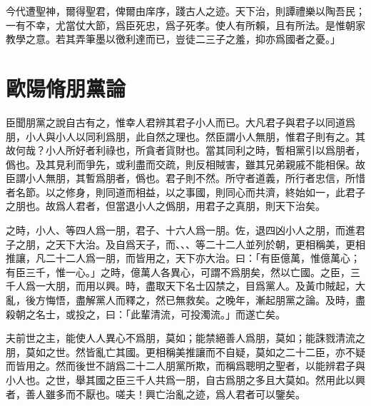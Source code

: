 今代遭聖神，爾得聖君，俾爾由庠序，踐古人之迹。天下治，則譚禮樂以陶吾民；一有不幸，尤當仗大節，爲臣死忠，爲子死孝。使人有所賴，且有所法。是惟朝家教學之意。若其弄筆墨以徼利達而已，豈徒二三子之羞，抑亦爲國者之憂。」

\theendnotes

\section[朋黨論\quad{\small 歐陽脩}]{{\normalsize 歐陽脩}\quad 朋黨論}
臣聞朋黨之說自古有之，惟幸人君辨其君子小人而已。大凡君子與君子以同道爲朋，小人與小人以同利爲朋，此自然之理也。然臣謂小人無朋，惟君子則有之。其故何哉？小人所好者利祿也，所貪者貨財也。當其同利之時，暫相黨引以爲朋者，僞也。及其見利而爭先，或利盡而交疏，則反相賊害，雖其兄弟親戚不能相保。故臣謂小人無朋，其暫爲朋者，僞也。君子則不然。所守者道義，所行者忠信，所惜者名節。以之修身，則同道而相益，以之事國，則同心而共濟，終始如一，此君子之朋也。故爲人君者，但當退小人之僞朋，用君子之真朋，則天下治矣。

之時，小人、等四人爲一朋，君子、十六人爲一朋。佐，退四凶小人之朋，而進君子之朋，之天下大治。及自爲天子，而、、、等二十二人並{列}於朝，更相稱美，更相推讓，凡二十二人爲一朋，而皆用之，天下亦大治。曰：「有臣億萬，惟億萬心；有臣三千，惟一心。」之時，億萬人各異心，可謂不爲朋矣，然以亡國。之臣，三千人爲一大朋，而用以興。時，盡取天下名士囚禁之，目爲黨人。及黃巾賊起，大亂，後方悔悟，盡解黨人而釋之，然已無救矣。之晚年，漸起朋黨之論。及時，盡殺朝之名士，或投之，曰：「此輩清流，可投濁流。」而遂亡矣。

夫前世之主，能使人人異心不爲朋，莫如；能禁絕善人爲朋，莫如；能誅戮清流之朋，莫如之世。然皆亂亡其國。更相稱美推讓而不自疑，莫如之二十二臣，亦不疑而皆用之。然而後世不誚爲二十二人朋黨所欺，而稱爲聰明之聖者，以能辨君子與小人也。之世，舉其國之臣三千人共爲一朋，自古爲朋之多且大莫如。然用此以興者，善人雖多而不厭也。嗟{夫}！興亡治亂之迹，爲人君者可以鑒矣。


